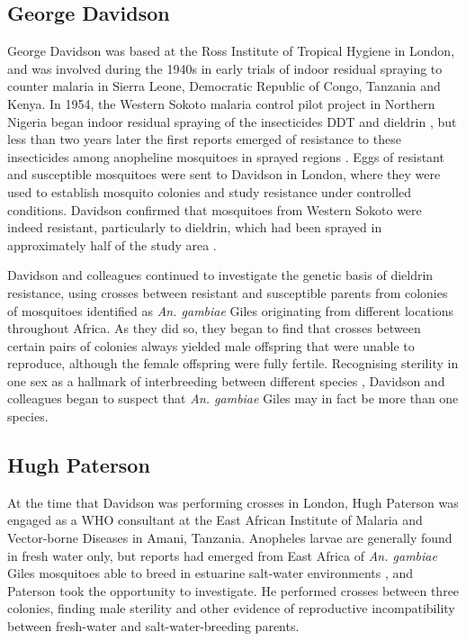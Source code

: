 \documentclass[a4paper,11pt,abstracton,hidelinks]{scrartcl}
\begin{document}
\subsection{George Davidson}

George Davidson was based at the Ross Institute of Tropical Hygiene in London, and was involved during the 1940s in early trials of indoor residual spraying to counter malaria in Sierra Leone, Democratic Republic of Congo, Tanzania and Kenya.
%
In 1954, the Western Sokoto malaria control pilot project in Northern Nigeria began indoor residual spraying of the insecticides DDT and dieldrin \citep{BruceChwatt1959}, but less than two years later the first reports emerged of resistance to these insecticides among anopheline mosquitoes in sprayed regions \citep{Elliott1956}.
%
Eggs of resistant and susceptible mosquitoes were sent to Davidson in London, where they were used to establish mosquito colonies and study resistance under controlled conditions.
%
Davidson confirmed that mosquitoes from Western Sokoto were indeed resistant, particularly to dieldrin, which had been sprayed in approximately half of the study area \citep{Davidson1956}.

Davidson and colleagues continued to investigate the genetic basis of dieldrin resistance, using crosses between resistant and susceptible parents from colonies of mosquitoes identified as \textit{An. gambiae} Giles originating from different locations throughout Africa.
%
As they did so, they began to find that crosses between certain pairs of colonies always yielded male offspring that were unable to reproduce, although the female offspring were fully fertile.
%
Recognising sterility in one sex as a hallmark of interbreeding between different species \citep{Haldane1922}, Davidson and colleagues began to suspect that \textit{An. gambiae} Giles may in fact be more than one species.


\subsection{Hugh Paterson}

At the time that Davidson was performing crosses in London, Hugh Paterson was engaged as a WHO consultant at the East African Institute of Malaria and Vector-borne Diseases in Amani, Tanzania.
%
Anopheles larvae are generally found in fresh water only, but reports had emerged from East Africa of \textit{An. gambiae} Giles mosquitoes able to breed in estuarine salt-water environments \citep{DeMeillon1947,MuirheadThomson1948}, and Paterson took the opportunity to investigate.
%
He performed crosses between three colonies, finding male sterility and other evidence of reproductive incompatibility between fresh-water and salt-water-breeding parents.
\end{document}
